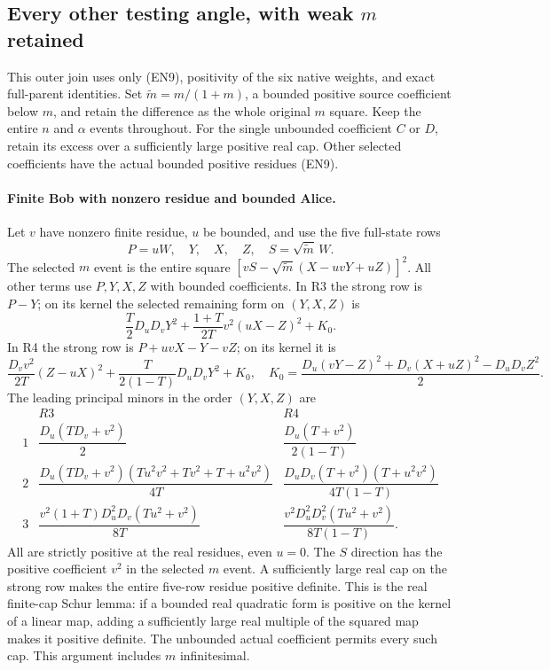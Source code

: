 \subsection{Every other testing angle, with weak \(m\) retained}

This outer join uses only (EN9), positivity of the six native
weights, and exact full-parent identities. Set
$\widetilde m=m/(1+m)$, a bounded positive source coefficient below
$m$, and retain the difference as the whole original $m$ square.
Keep the entire $n$ and $\alpha$ events throughout.
For the single unbounded coefficient $C$ or $D$, retain its excess
over a sufficiently large positive real cap. Other selected
coefficients have the actual bounded positive residues (EN9).

\paragraph{Finite Bob with nonzero residue and bounded Alice.}
Let $v$ have nonzero finite residue, $u$ be bounded, and use the
five full-state rows
\[
P=uW,\quad Y,\quad X,\quad Z,\quad S=\sqrt{\widetilde m}\,W.
                                                               \tag{EN21}
\]
The selected $m$ event is the entire square
$[vS-\sqrt{\widetilde m}(X-uvY+uZ)]^2$.
All other terms use $P,Y,X,Z$ with bounded coefficients.
In R3 the strong row is $P-Y$; on its kernel the selected remaining
form on $(Y,X,Z)$ is
\[
\frac T2D_uD_vY^2+\frac{1+T}{2T}v^2(uX-Z)^2+K_0 .
\]
In R4 the strong row is $P+uvX-Y-vZ$; on its kernel it is
\[
\frac{D_vv^2}{2T}(Z-uX)^2+
\frac{T}{2(1-T)}D_uD_vY^2+K_0 ,
\quad
K_0=\frac{D_u(vY-Z)^2+D_v(X+uZ)^2-D_uD_vZ^2}{2}.
\]
The leading principal minors in the order $(Y,X,Z)$ are
\[
\begin{array}{c|c|c}
 &R3&R4\\ \hline
1&
\dfrac{D_u(TD_v+v^2)}2&
\dfrac{D_u(T+v^2)}{2(1-T)}\\[4pt]
2&
\dfrac{D_u(TD_v+v^2)(Tu^2v^2+Tv^2+T+u^2v^2)}{4T}&
\dfrac{D_uD_v(T+v^2)(T+u^2v^2)}{4T(1-T)}\\[4pt]
3&
\dfrac{v^2(1+T)D_u^2D_v(Tu^2+v^2)}{8T}&
\dfrac{v^2D_u^2D_v^2(Tu^2+v^2)}{8T(1-T)} .
\end{array}                                                    \tag{EN22}
\]
All are strictly positive at the real residues, even $u=0$.
The $S$ direction has the positive coefficient $v^2$ in the
selected $m$ event. A sufficiently large real cap on the strong
row makes the entire five-row residue positive definite.
This is the real finite-cap Schur lemma: if a bounded real
quadratic form is positive on the kernel of a linear map, adding
a sufficiently large real multiple of the squared map makes it
positive definite. The unbounded actual coefficient permits
every such cap. This argument includes $m$ infinitesimal.

